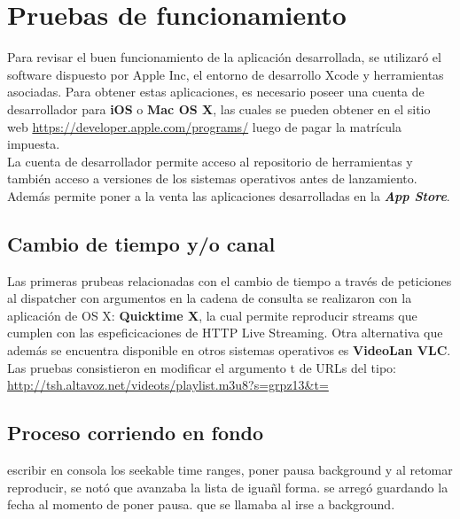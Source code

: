 
\chapter{Pruebas de funcionamiento}

Para revisar el buen funcionamiento de la aplicación desarrollada, se utilizaró el software dispuesto por Apple Inc,  el entorno de desarrollo Xcode y herramientas asociadas. Para obtener estas aplicaciones, es necesario poseer una cuenta de desarrollador para \textbf{iOS} o \textbf{Mac OS X}, las cuales se pueden obtener en el sitio web \url{https://developer.apple.com/programs/} luego de pagar la matrícula impuesta.\\

La cuenta de desarrollador permite acceso al repositorio de herramientas \cite{apple-repositorio} y también acceso a versiones de los sistemas operativos antes de lanzamiento.
Además permite poner a la venta las aplicaciones desarrolladas en la \textit{\textbf{App Store}}\cite{apple-appstore}.

\section{Cambio de tiempo y/o canal}

Las primeras prubeas relacionadas con el cambio de tiempo a través de peticiones al dispatcher con argumentos en la cadena de consulta se realizaron con la aplicación de OS X: \textbf{Quicktime X}, la cual permite reproducir streams que cumplen con las espeficicaciones de HTTP Live Streaming. Otra alternativa que además se encuentra disponible en otros sistemas operativos es \textbf{VideoLan VLC}. Las pruebas consistieron en modificar el argumento t de URLs del tipo:
\url{http://tsh.altavoz.net/videots/playlist.m3u8?s=grpz13&t=}




\section{Proceso corriendo en fondo} %

escribir en consola los seekable time ranges, poner pausa background y al retomar reproducir, se notó que avanzaba la lista de iguañl forma. se arregó guardando la fecha al momento de poner pausa. que se llamaba al irse a background.

